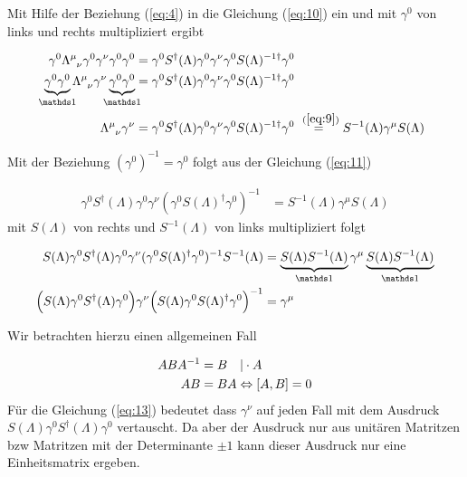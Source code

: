 Mit Hilfe der Beziehung (\ref{eq:4}) in die Gleichung (\ref{eq:10}) ein und mit \(\gamma^0\) von links und rechts multipliziert ergibt

\begin{align}
  \label{eq:11}
  \gamma^0\Lambda^{\mu}_{\hphantom \mu \nu}\gamma^0\gamma^\nu \gamma^0\gamma^0   &= \gamma^0 S^\dagger(\Lambda) \gamma^0\gamma^\nu \gamma^0  S(\Lambda)^{-1\dagger}\gamma^0\notag \\
%
\underbr{ \gamma^0\gamma^0}_{\mathds 1}\Lambda^{\mu}_{\hphantom \mu \nu}\gamma^\nu \underbr{\gamma^0\gamma^0}_{\mathds 1}   &= \gamma^0 S^\dagger(\Lambda) \gamma^0\gamma^\nu \gamma^0  S(\Lambda)^{-1\dagger}\gamma^0\notag \\
%
\Lambda^{\mu}_{\hphantom \mu \nu}\gamma^\nu  &= \gamma^0 S^\dagger(\Lambda) \gamma^0\gamma^\nu \gamma^0  S(\Lambda)^{-1\dagger}\gamma^0 \stackrel{~(\ref{eq:9}) }= S^{-1}(\Lambda)\gamma^\mu  S(\Lambda)  
\end{align}

Mit der Beziehung \((\gamma^0)^{-1} = \gamma^0\) folgt aus der Gleichung (\ref{eq:11})

\begin{align}
  \label{eq:12}
  \gamma^0 S^\dagger(\Lambda) \gamma^0\gamma^\nu (\gamma^0 S(\Lambda)^{\dagger}\gamma^0)^{-1} &=  S^{-1}(\Lambda)\gamma^\mu  S(\Lambda) 
\end{align}
 mit \(S(\Lambda)\) von rechts und \(S^{-1}(\Lambda)\) von links multipliziert folgt

 \begin{align}
   \label{eq:13}
  S(\Lambda)  \gamma^0 S^\dagger(\Lambda) \gamma^0\gamma^\nu (\gamma^0 S(\Lambda)^{\dagger}\gamma^0)^{-1}S^{-1}(\Lambda) &= \underbr{S(\Lambda)  S^{-1}(\Lambda)}_{\mathds 1}\gamma^\mu \underbr{ S(\Lambda) S^{-1}(\Lambda)}_{\mathds 1} \notag \\
 \Big(S(\Lambda)  \gamma^0 S^\dagger(\Lambda) \gamma^0\Big)\gamma^\nu \Big(S(\Lambda) \gamma^0 S(\Lambda)^{\dagger}\gamma^0\Big)^{-1} &= \gamma^\mu 
 \end{align}

Wir betrachten hierzu einen allgemeinen Fall

\begin{align}
  \label{eq:14}
  A B A^{-1} &= B \quad |\cdot A \notag \\
  A B &= BA \Leftrightarrow [A,B] = 0
\end{align}
Für die Gleichung (\ref{eq:13}) bedeutet dass \(\gamma^\nu \) auf jeden Fall mit dem Ausdruck \(S(\Lambda)  \gamma^0 S^\dagger(\Lambda) \gamma^0\) vertauscht. Da aber der Ausdruck nur aus unitären Matritzen bzw Matritzen mit der Determinante \(\pm 1\) kann dieser Ausdruck nur eine Einheitsmatrix ergeben.

